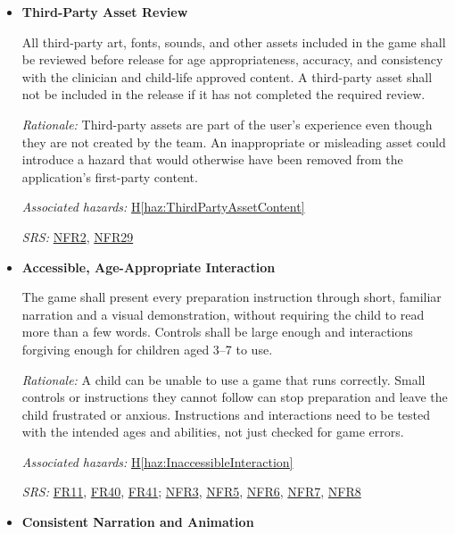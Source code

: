 \documentclass{article}
\newcounter{hazard}
\newcommand{\hazref}[1]{\hyperref[haz:#1]{H\ref*{haz:#1}}}
\newcounter{sr}
\newcommand{\srdef}[1]{\refstepcounter{sr}\label{sr:#1}\textbf{SR-\thesr:}}
\newcommand{\srsurl}{https://team-hindsight.github.io/ophthamology-game/SRS-IEEE/SRS.pdf}
\newcommand{\srsfrref}[2]{\href{\srsurl\#nameddest=#1}{FR#2}}
\newcommand{\srsnfrref}[2]{\href{\srsurl\#nameddest=#1}{NFR#2}}
\begin{document}
\begin{itemize}[leftmargin=1.5cm, labelwidth=1.3cm, labelsep=0.2cm,
  align=left, itemsep=1.2em, parsep=0.6em]
\textit{Associated hazards:}
\hazref{ThirdPartyFailure}, \hazref{UnexpectedDataTransmission}

\textit{SRS:} \srsnfrref{NFR_DependencyTesting}{26}, \srsnfrref{NFR_Immunity}{25}, \srsnfrref{NFR_Privacy}{23}

\item[\srdef{ThirdPartyAssetReview}]
\textbf{Third-Party Asset Review}

All third-party art, fonts, sounds, and other
assets included in the game shall be reviewed
before release for age appropriateness,
accuracy, and consistency with the clinician
and child-life approved content. A third-party
asset shall not be included in the release if
it has not completed the required review.

\textit{Rationale:}
Third-party assets are part of the user's
experience even though they are not created by
the team. An inappropriate or misleading asset
could introduce a hazard that would otherwise
have been removed from the application's
first-party content.

\textit{Associated hazards:}
\hazref{ThirdPartyAssetContent}

\textit{SRS:} \srsnfrref{NFR_ChildSafe}{2}, \srsnfrref{NFR_Licensing}{29}

\item[\srdef{AccessibleInteraction}]
\textbf{Accessible, Age-Appropriate Interaction}

The game shall present every preparation instruction through
short, familiar narration and a visual demonstration, without
requiring the child to read more than a few words. Controls shall be large enough
and interactions forgiving enough for children aged 3--7 to use.

\textit{Rationale:}
A child can be unable to use a game that runs correctly.
Small controls or instructions they cannot follow can stop
preparation and leave the child frustrated or anxious.
Instructions and interactions need to be tested with the
intended ages and abilities, not just checked for game errors.

\textit{Associated hazards:}
\hazref{InaccessibleInteraction}

\textit{SRS:} \srsfrref{FR_SpokenInstructions}{11}, \srsfrref{FR_Preferences}{40}, \srsfrref{FR_AgeGroup}{41}; \srsnfrref{NFR_TouchTarget}{3}, \srsnfrref{NFR_Usability}{5}, \srsnfrref{NFR_Language}{6}, \srsnfrref{NFR_Accessibility}{7}, \srsnfrref{NFR_Colour}{8}

\item[\srdef{ConsistentAudioVisuals}]
\textbf{Consistent Narration and Animation}


\end{itemize}
\end{document}

